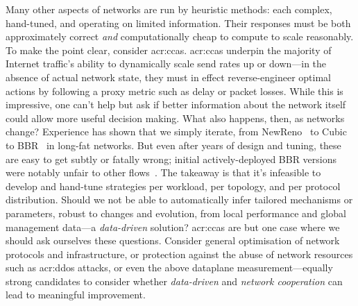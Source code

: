 Many other aspects of networks are run by heuristic methods: each complex, hand-tuned, and operating on limited information.
Their responses must be both approximately correct \emph{and} computationally cheap to compute to scale reasonably.
To make the point clear, consider \glspl{acr:cca}.
\glspl{acr:cca} underpin the majority of Internet traffic's ability to dynamically scale send rates up or down---in the absence of actual network state, they must in effect reverse-engineer optimal actions by following a proxy metric such as delay or packet losses.
While this is impressive, one can't help but ask if better information about the network itself could allow more useful decision making.
What also happens, then, as networks change? %
Experience has shown that we simply iterate, from NewReno~\parencite{rfc6582} to Cubic~\parencite{rfc8312} to BBR~\parencite{DBLP:journals/queue/CardwellCGYJ16} in long-fat networks.
But even after years of design and tuning, these are easy to get subtly or fatally wrong; initial actively-deployed BBR versions were notably unfair to other flows~\parencite{DBLP:conf/imc/WareMSS19}.
The takeaway is that it's infeasible to develop and hand-tune strategies per workload, per topology, and per protocol distribution.
Should we not be able to automatically infer tailored mechanisms or parameters, robust to changes and evolution, from local performance and global management data---a \emph{data-driven} solution?
\glspl{acr:cca} are but one case where we should ask ourselves these questions.
Consider general optimisation of network protocols and infrastructure, or protection against the abuse of network resources such as \gls{acr:ddos} attacks, or even the above dataplane measurement---equally strong candidates to consider whether \emph{data-driven} and \emph{network cooperation} can lead to meaningful improvement.



